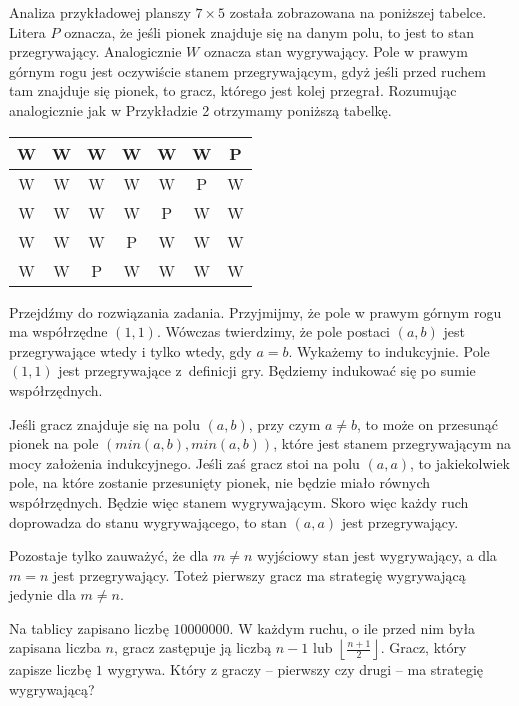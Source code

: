 \noindent
Analiza przykładowej planszy $7 \times 5$ została zobrazowana na poniższej tabelce. Litera $P$ oznacza, że jeśli pionek znajduje się na danym polu, to jest to stan przegrywający. Analogicznie $W$ oznacza stan wygrywający. Pole w prawym górnym rogu jest oczywiście stanem przegrywającym, gdyż jeśli przed ruchem tam znajduje się pionek, to gracz, którego jest kolej przegrał. Rozumując analogicznie jak w Przykładzie 2 otrzymamy poniższą tabelkę.
\begin{center}
\begin{tabular}{ |c|c|c|c|c|c|c|} 
 \hline
 W & W & W & W & W & W & P \\ 
 \hline
 W & W & W & W & W & P & W \\ 
 \hline
 W & W & W & W & P & W & W \\ 
 \hline
 W & W & W & P & W & W & W \\ 
 \hline
 W & W & P & W & W & W & W \\ 
 \hline
\end{tabular}
\end{center}

\noindent
Przejdźmy do rozwiązania zadania. Przyjmijmy, że pole w prawym górnym rogu ma współrzędne $(1, 1)$. Wówczas twierdzimy, że pole postaci $(a, b)$ jest przegrywające wtedy i tylko wtedy, gdy $a = b$. Wykażemy to indukcyjnie. Pole $(1, 1)$ jest przegrywające z~definicji gry. Będziemy indukować się po sumie współrzędnych.

\vspace{10px}
\noindent
Jeśli gracz znajduje się na polu $(a, b)$, przy czym $a \neq b$, to może on przesunąć pionek na pole $(min(a, b), min(a, b))$, które jest stanem przegrywającym na mocy założenia indukcyjnego. Jeśli zaś gracz stoi na polu $(a, a)$, to jakiekolwiek pole, na które zostanie przesunięty pionek, nie będzie miało równych współrzędnych. Będzie więc stanem wygrywającym. Skoro więc każdy ruch doprowadza do stanu wygrywającego, to stan $(a, a)$ jest przegrywający.

\vspace{10px}
\noindent
Pozostaje tylko zauważyć, że dla $m \neq n$ wyjściowy stan jest wygrywający, a dla $m = n$ jest przegrywający. Toteż pierwszy gracz ma strategię wygrywającą jedynie dla $m \neq n$.

\begin{problem}{3}
	Na tablicy zapisano liczbę $10000000$. W każdym ruchu, o ile przed nim była zapisana liczba $n$, gracz zastępuje ją liczbą $n - 1$ lub $\left\lfloor\frac{n + 1}{2}\right\rfloor$. Gracz, który zapisze liczbę $1$ wygrywa. Który z graczy – pierwszy czy drugi – ma strategię wygrywającą?
\end{problem}

